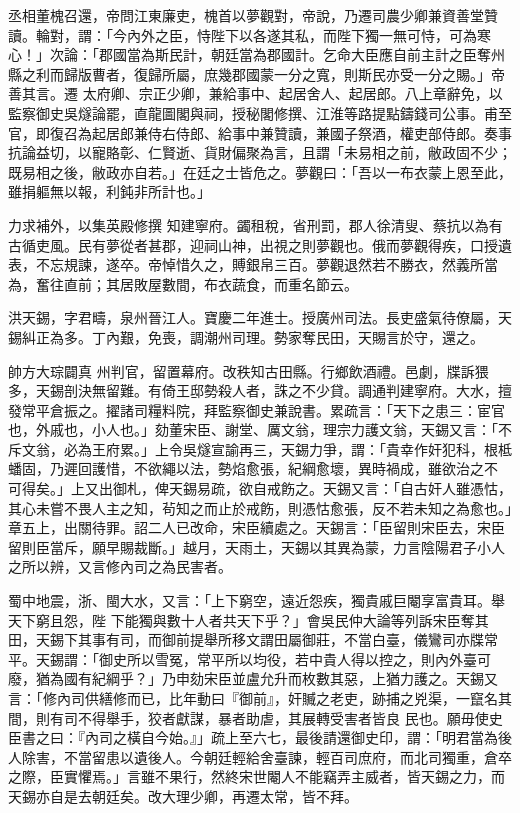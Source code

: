 \begin{pinyinscope}
 丞相董槐召還，帝問江東廉吏，槐首以夢觀對，帝說，乃遷司農少卿兼資善堂贊讀。輪對，謂：「今內外之臣，恃陛下以各遂其私，而陛下獨一無可恃，可為寒心！」次論：「郡國當為斯民計，朝廷當為郡國計。乞命大臣應自前主計之臣奪州縣之利而歸版曹者，復歸所屬，庶幾郡國蒙一分之寬，則斯民亦受一分之賜。」帝善其言。遷
 太府卿、宗正少卿，兼給事中、起居舍人、起居郎。八上章辭免，以監察御史吳燧論罷，直龍圖閣與祠，授秘閣修撰、江淮等路提點鑄錢司公事。甫至官，即復召為起居郎兼侍右侍郎、給事中兼贊讀，兼國子祭酒，權吏部侍郎。奏事抗論益切，以寵賂彰、仁賢逝、貨財偏聚為言，且謂「未易相之前，敝政固不少；既易相之後，敝政亦自若。」在廷之士皆危之。夢觀曰：「吾以一布衣蒙上恩至此，雖捐軀無以報，利鈍非所計也。」



 力求補外，以集英殿修撰
 知建寧府。蠲租稅，省刑罰，郡人徐清叟、蔡抗以為有古循吏風。民有夢從者甚郡，迎祠山神，出視之則夢觀也。俄而夢觀得疾，口授遺表，不忘規諫，遂卒。帝悼惜久之，賻銀帛三百。夢觀退然若不勝衣，然義所當為，奮往直前；其居敗屋數間，布衣蔬食，而重名節云。



 洪天錫，字君疇，泉州晉江人。寶慶二年進士。授廣州司法。長吏盛氣待僚屬，天錫糾正為多。丁內艱，免喪，調潮州司理。勢家奪民田，天賜言於守，還之。



 帥方大琮闢真
 州判官，留置幕府。改秩知古田縣。行鄉飲酒禮。邑劇，牒訴猥多，天錫剖決無留難。有倚王邸勢殺人者，誅之不少貸。調通判建寧府。大水，擅發常平倉振之。擢諸司糧料院，拜監察御史兼說書。累疏言：「天下之患三：宦官也，外戚也，小人也。」劾董宋臣、謝堂、厲文翁，理宗力護文翁，天錫又言：「不斥文翁，必為王府累。」上令吳燧宣諭再三，天錫力爭，謂：「貴幸作奸犯科，根柢蟠固，乃遲回護惜，不欲繩以法，勢焰愈張，紀綱愈壞，異時禍成，雖欲治之不
 可得矣。」上又出御札，俾天錫易疏，欲自戒飭之。天錫又言：「自古奸人雖憑怙，其心未嘗不畏人主之知，茍知之而止於戒飭，則憑怙愈張，反不若未知之為愈也。」章五上，出關待罪。詔二人已改命，宋臣續處之。天錫言：「臣留則宋臣去，宋臣留則臣當斥，願早賜裁斷。」越月，天雨土，天錫以其異為蒙，力言陰陽君子小人之所以辨，又言修內司之為民害者。



 蜀中地震，浙、閩大水，又言：「上下窮空，遠近怨疾，獨貴戚巨閹享富貴耳。舉天下窮且怨，陛
 下能獨與數十人者共天下乎？」會吳民仲大論等列訴宋臣奪其田，天錫下其事有司，而御前提舉所移文謂田屬御莊，不當白臺，儀鸞司亦牒常平。天錫謂：「御史所以雪冤，常平所以均役，若中貴人得以控之，則內外臺可廢，猶為國有紀綱乎？」乃申劾宋臣並盧允升而枚數其惡，上猶力護之。天錫又言：「修內司供繕修而已，比年動曰『御前』，奸贓之老吏，跡捕之兇渠，一竄名其間，則有司不得舉手，狡者獻謀，暴者助虐，其展轉受害者皆良
 民也。願毋使史臣書之曰：『內司之橫自今始。』」疏上至六七，最後請還御史印，謂：「明君當為後人除害，不當留患以遺後人。今朝廷輕給舍臺諫，輕百司庶府，而北司獨重，倉卒之際，臣實懼焉。」言雖不果行，然終宋世閹人不能竊弄主威者，皆天錫之力，而天錫亦自是去朝廷矣。改大理少卿，再遷太常，皆不拜。




\end{pinyinscope}
